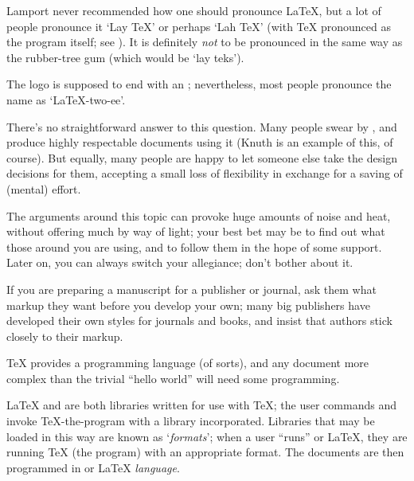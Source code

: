 
Lamport never recommended how one should pronounce \LaTeX{}, but a lot
of people pronounce it `Lay \TeX{}' or perhaps `Lah \TeX{}' (with
\TeX{} pronounced as the program itself; see
).  It is definitely
\emph{not} to be pronounced in the same way as the rubber-tree gum
(which would be `lay teks').

The \LaTeXe{} logo is supposed to end with an
; nevertheless, most
people pronounce the name as `\LaTeX{}-two-ee'.


There's no straightforward answer to this question.  Many people swear
by \plaintex{}, and produce highly respectable documents using it
(Knuth is an example of this, of course).  But equally, many people
are happy to let someone else take the design decisions for them,
accepting a small loss of flexibility in exchange for a saving of
(mental) effort.

The arguments around this topic can provoke huge amounts of noise and
heat, without offering much by way of light; your best bet may be to
find out what those around you are using, and to follow them in the
hope of some support.  Later on, you can always switch your
allegiance; don't bother about it.

If you are preparing a manuscript for a publisher or journal, ask them
what markup they want before you
develop your own; many big publishers have developed their own
\AllTeX{} styles for journals and books, and insist that authors stick
closely to their markup.


\TeX{} provides a programming language (of sorts), and any document
more complex than the trivial ``hello world'' will need some
programming.

\LaTeX{} and \plaintex{} are both libraries written for use with
\TeX{}; the user commands  and  invoke
\TeX{}-the-program with a library incorporated.  Libraries that may be
loaded in this way are known as `\emph{formats}'; when a user ``runs''
\plaintex{} or \LaTeX{}, they are running \TeX{} (the program) with an
appropriate format.  The documents are then programmed in \plaintex{}
or \LaTeX{} \emph{language}.

